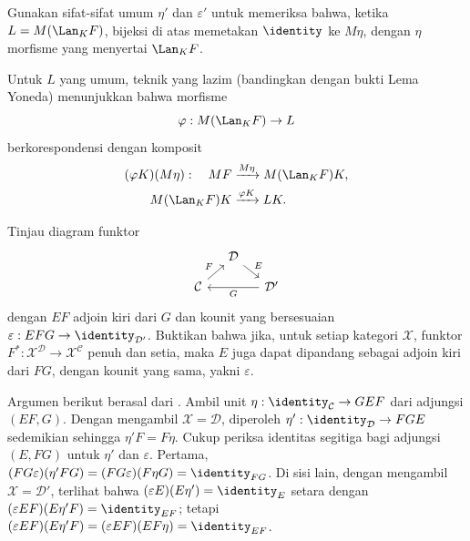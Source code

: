 \begin{Exercises}
\begin{hint}
		Gunakan sifat-sifat umum $\eta'$ dan $\varepsilon'$ untuk memeriksa bahwa,
		ketika $L=M(\Lan_KF)$, bijeksi di atas memetakan $\identity$ ke
		$M\eta$, dengan $\eta$ morfisme yang menyertai $\Lan_KF$.

		Untuk $L$ yang umum, teknik yang lazim (bandingkan dengan bukti Lema
		Yoneda) menunjukkan bahwa morfisme
		\[ \varphi:M(\Lan_KF)\to L \]
		berkorespondensi dengan komposit
		\[
		\begin{aligned}
			(\varphi K)(M\eta):\quad MF
			&\xrightarrow{M\eta} M(\Lan_K F)K, \\
			M(\Lan_K F)K &\xrightarrow{\varphi K} LK .
		\end{aligned}
		\]
	\end{hint}

	\item Tinjau diagram funktor
	\[\begin{tikzcd}[column sep=small, row sep=small]
		& \mathcal{D} \arrow[rd, "E"] & \\
		\mathcal{C} \arrow[ru, "F"] & & \mathcal{D}' \arrow[ll, "G"]
	\end{tikzcd}\]
	dengan $EF$ adjoin kiri dari $G$ dan kounit yang bersesuaian
	$\varepsilon:EFG\to\identity_{\mathcal{D}'}$. Buktikan bahwa jika, untuk
	setiap kategori $\mathcal{X}$, funktor
	$F^*:\mathcal{X}^{\mathcal{D}}\to\mathcal{X}^{\mathcal{C}}$ penuh dan
	setia, maka $E$ juga dapat dipandang sebagai adjoin kiri dari $FG$, dengan
	kounit yang sama, yakni $\varepsilon$.

	\begin{hint}
		Argumen berikut berasal dari \cite[Lema I.1.3.1]{GZ67}. Ambil unit
		$\eta:\identity_{\mathcal{C}}\to GEF$ dari adjungsi $(EF,G)$. Dengan
		mengambil $\mathcal{X}=\mathcal{D}$, diperoleh
		$\eta':\identity_{\mathcal{D}}\to FGE$ sedemikian sehingga
		$\eta'F=F\eta$. Cukup periksa identitas segitiga bagi adjungsi $(E,FG)$
		untuk $\eta'$ dan $\varepsilon$. Pertama,
		$(FG\varepsilon)(\eta'FG)=(FG\varepsilon)(F\eta G)=\identity_{FG}$.
		Di sisi lain, dengan mengambil $\mathcal{X}=\mathcal{D}'$, terlihat bahwa
		$(\varepsilon E)(E\eta')=\identity_E$ setara dengan
		$(\varepsilon EF)(E\eta'F)=\identity_{EF}$; tetapi
		$(\varepsilon EF)(E\eta'F)=(\varepsilon EF)(EF\eta)=\identity_{EF}$.
	\end{hint}


\end{Exercises}
